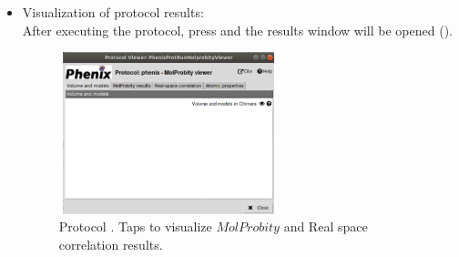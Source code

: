 \begin{itemize}
 \item Visualization of protocol results:\\
  
  After executing the protocol, press  and the results window will be opened ().\\ 
  
  \begin{figure}[H]
     \centering 
     \captionsetup{width=.7\linewidth} 
     \includegraphics[width=0.60\textwidth]{Images_appendix/Fig144.pdf}
     \caption{Protocol . Taps to visualize $MolProbity$  and Real space correlation results.}
     \label{fig:app_protocol_molprobity_2}
    \end{figure}
    

\end{itemize}
